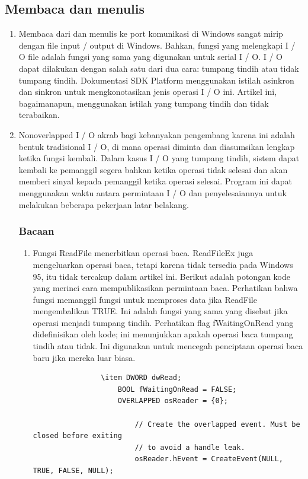 	\subsection{Membaca dan menulis}
		\begin{enumerate}
			\item Membaca dari dan menulis ke port komunikasi di Windows sangat mirip dengan file input / output  di Windows. Bahkan, fungsi yang melengkapi I / O file adalah fungsi yang sama yang digunakan untuk serial I / O. I / O dapat dilakukan dengan salah satu dari dua cara: tumpang tindih atau tidak tumpang tindih. Dokumentasi SDK Platform menggunakan istilah asinkron dan sinkron untuk mengkonotasikan jenis operasi I / O ini. Artikel ini, bagaimanapun, menggunakan istilah yang tumpang tindih dan tidak terabaikan.
			\item Nonoverlapped I / O akrab bagi kebanyakan pengembang karena ini adalah bentuk tradisional I / O, di mana operasi diminta dan diasumsikan lengkap ketika fungsi kembali. Dalam kasus I / O yang tumpang tindih, sistem dapat kembali ke pemanggil segera bahkan ketika operasi tidak selesai dan akan memberi sinyal kepada pemanggil ketika operasi selesai. Program ini dapat menggunakan waktu antara permintaan I / O dan penyelesaiannya untuk melakukan beberapa pekerjaan latar belakang.
				\subsubsection{Bacaan}
					\begin{enumerate}
						\item Fungsi ReadFile menerbitkan operasi baca. ReadFileEx juga mengeluarkan operasi baca, tetapi karena tidak tersedia pada Windows 95, itu tidak tercakup dalam artikel ini. Berikut adalah potongan kode yang merinci cara mempublikasikan permintaan baca. Perhatikan bahwa fungsi memanggil fungsi untuk memproses data jika ReadFile mengembalikan TRUE. Ini adalah fungsi yang sama yang disebut jika operasi menjadi tumpang tindih. Perhatikan flag fWaitingOnRead yang didefinisikan oleh kode; ini menunjukkan apakah operasi baca tumpang tindih atau tidak. Ini digunakan untuk mencegah penciptaan operasi baca baru jika mereka luar biasa.
				
				\begin{verbatim}
				\item DWORD dwRead;
					BOOL fWaitingOnRead = FALSE;
					OVERLAPPED osReader = {0};

						// Create the overlapped event. Must be closed before exiting
						// to avoid a handle leak.
						osReader.hEvent = CreateEvent(NULL, TRUE, FALSE, NULL);


\end{verbatim}
\end{enumerate}
\end{enumerate}
